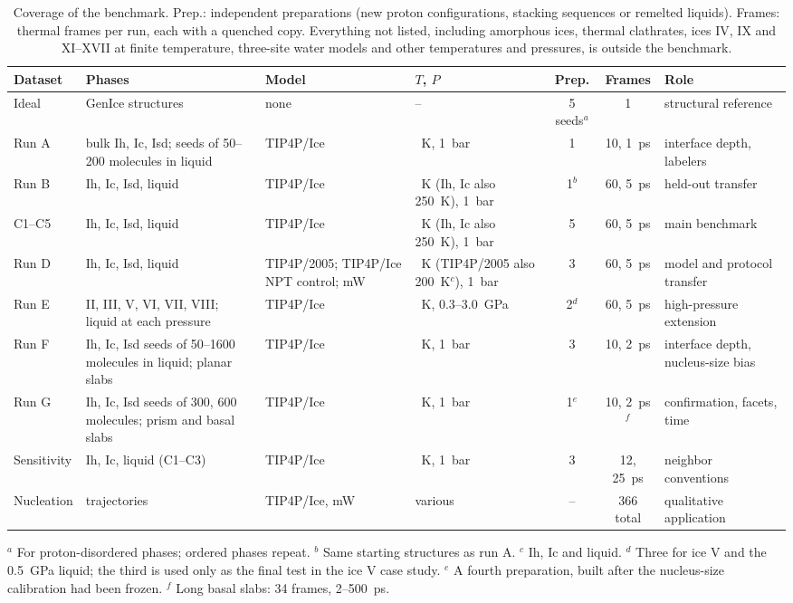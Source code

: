 \documentclass[11pt,a4paper]{article}
\begin{document}
\begin{table}[H]
\centering
\footnotesize
\caption{Coverage of the benchmark. Prep.: independent preparations (new
proton configurations, stacking sequences or remelted liquids). Frames: thermal
frames per run, each with a quenched copy. Everything not listed, including
amorphous ices, thermal clathrates, ices IV, IX and XI--XVII at finite
temperature, three-site water models and other temperatures and pressures, is
outside the benchmark.}
\label{tab:coverage}
\setlength{\tabcolsep}{3pt}
\begin{tabular}{>{\raggedright\arraybackslash}p{.11\linewidth}>{\raggedright\arraybackslash}p{.21\linewidth}>{\raggedright\arraybackslash}p{.15\linewidth}>{\raggedright\arraybackslash}p{.14\linewidth}cc>{\raggedright\arraybackslash}p{.14\linewidth}}
\toprule
Dataset & Phases & Model & $T$, $P$ & Prep. & Frames & Role \\
\midrule
Ideal & 18 GenIce structures & none & -- & 5 seeds$^a$ & 1 & structural reference \\
Run A & bulk Ih, Ic, Isd; seeds of 50--200 molecules in liquid & TIP4P/Ice & 220~K, 1~bar & 1 & 10, 1~ps & interface depth, labelers \\
Run B & Ih, Ic, Isd, liquid & TIP4P/Ice & 220~K (Ih, Ic also 250~K), 1~bar & 1$^b$ & 60, 5~ps & held-out transfer \\
C1--C5 & Ih, Ic, Isd, liquid & TIP4P/Ice & 220~K (Ih, Ic also 250~K), 1~bar & 5 & 60, 5~ps & main benchmark \\
Run D & Ih, Ic, Isd, liquid & TIP4P/2005; TIP4P/Ice NPT control; mW & 220~K (TIP4P/2005 also 200~K$^c$), 1~bar & 3 & 60, 5~ps & model and protocol transfer \\
Run E & II, III, V, VI, VII, VIII; liquid at each pressure & TIP4P/Ice & 220~K, 0.3--3.0~GPa & 2$^d$ & 60, 5~ps & high-pressure extension \\
Run F & Ih, Ic, Isd seeds of 50--1600 molecules in liquid; planar slabs & TIP4P/Ice & 220~K, 1~bar & 3 & 10, 2~ps & interface depth, nucleus-size bias \\
Run G & Ih, Ic, Isd seeds of 300, 600 molecules; prism and basal slabs & TIP4P/Ice & 220~K, 1~bar & 1$^e$ & 10, 2~ps$^f$ & confirmation, facets, time \\
Sensitivity & Ih, Ic, liquid (C1--C3) & TIP4P/Ice & 220~K, 1~bar & 3 & 12, 25~ps & neighbor conventions \\
Nucleation & 44 trajectories & TIP4P/Ice, mW & various & -- & 366 total & qualitative application \\
\bottomrule
\end{tabular}

\raggedright\footnotesize $^a$ For proton-disordered phases; ordered phases
repeat. $^b$ Same starting structures as run A. $^c$ Ih, Ic and liquid.
$^d$ Three for ice V and the 0.5~GPa liquid; the third is used only as the final
test in the ice V case study. $^e$ A fourth preparation, built after the
nucleus-size calibration had been frozen. $^f$ Long basal slabs: 34 frames, 2--500~ps.
\end{table}
\end{document}
